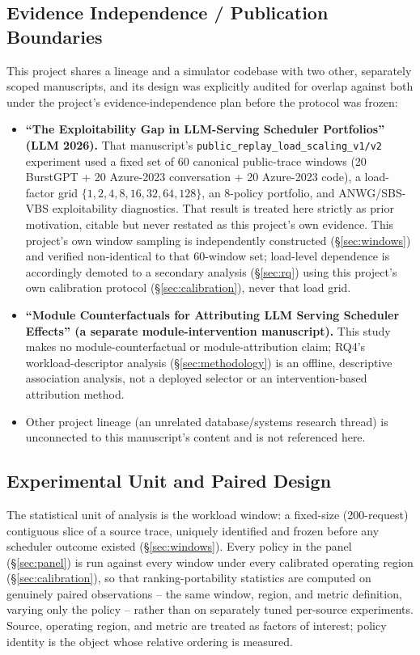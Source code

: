 \documentclass[sn-basic,Numbered,pdflatex]{sn-jnl}
\begin{document}
\subsection{Evidence Independence / Publication Boundaries}
\label{sec:evidence-boundaries}

This project shares a lineage and a simulator codebase with two other,
separately scoped manuscripts, and its design was explicitly audited for overlap against both under the project's evidence-independence plan before the protocol was frozen:

\begin{itemize}
  \item \textbf{``The Exploitability Gap in LLM-Serving Scheduler
    Portfolios'' (LLM 2026).} That manuscript's
    \texttt{public\_replay\_load\_scaling\_v1/v2} experiment used a fixed set
    of 60 canonical public-trace windows (20 BurstGPT + 20 Azure-2023
    conversation + 20 Azure-2023 code), a load-factor grid
    $\{1,2,4,8,16,32,64,128\}$, an 8-policy portfolio, and ANWG/SBS-VBS
    exploitability diagnostics. That result is treated here strictly as
    prior motivation, citable but never restated as this project's own
    evidence. This project's own window
    sampling is independently constructed (\S\ref{sec:windows}) and
    verified non-identical to that 60-window set; load-level dependence is
    accordingly demoted to a secondary analysis (\S\ref{sec:rq}) using this
    project's own calibration protocol (\S\ref{sec:calibration}), never that
    load grid.
  \item \textbf{``Module Counterfactuals for Attributing LLM Serving
    Scheduler Effects'' (a separate module-intervention manuscript).} This
    study makes no module-counterfactual or module-attribution claim; RQ4's
    workload-descriptor analysis (\S\ref{sec:methodology}) is an offline,
    descriptive association analysis, not a deployed selector or an
    intervention-based attribution method.
  \item Other project lineage (an unrelated database/systems research
    thread) is unconnected to this manuscript's content and is not
    referenced here.
\end{itemize}

\subsection{Experimental Unit and Paired Design}
\label{sec:unit}

The statistical unit of analysis is the workload window: a fixed-size
(200-request) contiguous slice of a source trace, uniquely identified and
frozen before any scheduler outcome existed (\S\ref{sec:windows}). Every
policy in the panel (\S\ref{sec:panel}) is run against every window under
every calibrated operating region (\S\ref{sec:calibration}), so that
ranking-portability statistics are computed on genuinely paired
observations -- the same window, region, and metric definition, varying
only the policy -- rather than on separately tuned per-source experiments.
Source, operating region, and metric are treated as factors of interest;
policy identity is the object whose relative ordering is measured.
\end{document}
